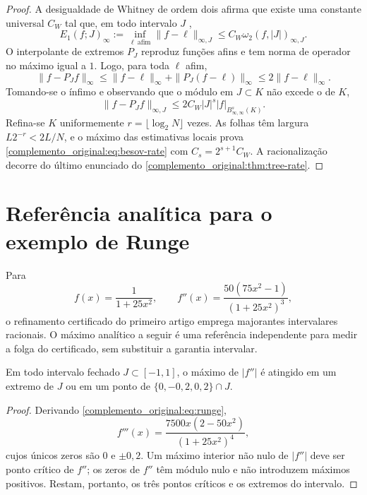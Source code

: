 \begin{proof}
A desigualdade de Whitney de ordem dois afirma que existe uma constante universal $C_W$ tal que, em todo intervalo $J$ \citep{artigo_2-whitney1957,artigo_1-devore1998},
\[
 E_1(f;J)_\infty:=\inf_{\ell\ \mathrm{afim}}\|f-\ell\|_{\infty,J}
 \le C_W\omega_2(f,|J|)_{\infty,J}.
\]
O interpolante de extremos $P_J$ reproduz funções afins e tem norma de operador no máximo igual a $1$. Logo, para toda $\ell$ afim,
\[
 \|f-P_Jf\|_\infty
 \le\|f-\ell\|_\infty+\|P_J(f-\ell)\|_\infty
 \le2\|f-\ell\|_\infty.
\]
Tomando-se o ínfimo e observando que o módulo em $J\subset K$ não excede o de $K$,
\[
 \|f-P_Jf\|_{\infty,J}
 \le2C_W|J|^s|f|_{B^s_{\infty,\infty}(K)}.
\]
Refina-se $K$ uniformemente $r=\lfloor\log_2N\rfloor$ vezes. As folhas têm largura $L2^{-r}<2L/N$, e o máximo das estimativas locais prova \eqref{complemento_original:eq:besov-rate} com $C_s=2^{s+1}C_W$. A racionalização decorre do último enunciado do \cref{complemento_original:thm:tree-rate}.
\end{proof}

\setcounter{section}{20}
\clearpage\section{Referência analítica para o exemplo de Runge}
Para
\begin{equation}
 f(x)=\frac{1}{1+25x^2},\qquad
 f''(x)=\frac{50(75x^2-1)}{(1+25x^2)^3},
 \label{complemento_original:eq:runge}
\end{equation}
o refinamento certificado do primeiro artigo emprega majorantes intervalares racionais. O máximo analítico a seguir é uma referência independente para medir a folga do certificado, sem substituir a garantia intervalar.

\begin{lemma}\label{map:complemento_original:21.1}\label{complemento_original:lem:runge-majorant}
Em todo intervalo fechado $J\subset[-1,1]$, o máximo de $|f''|$ é atingido em um extremo de $J$ ou em um ponto de $\{0,-0{,}2,0{,}2\}\cap J$.
\end{lemma}

\begin{proof}
Derivando \eqref{complemento_original:eq:runge},
\[
 f'''(x)=\frac{7500x(2-50x^2)}{(1+25x^2)^4},
\]
cujos únicos zeros são $0$ e $\pm0{,}2$. Um máximo interior não nulo de $|f''|$ deve ser ponto crítico de $f''$; os zeros de $f''$ têm módulo nulo e não introduzem máximos positivos. Restam, portanto, os três pontos críticos e os extremos do intervalo.
\end{proof}

